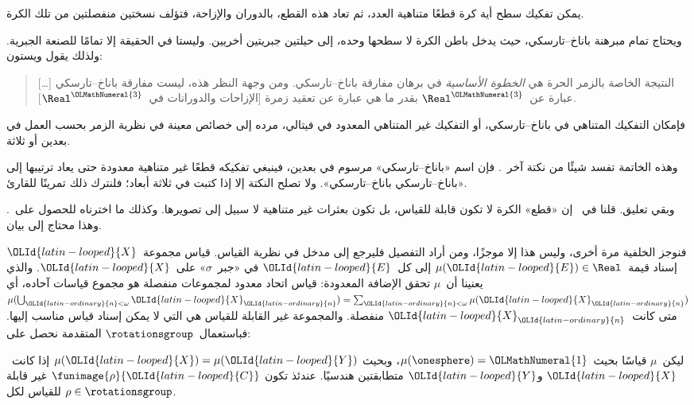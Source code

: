 \documentclass[../../../include/open-logic-section]{subfiles}
\begin{document}
\begin{thm}
يمكن تفكيك سطح أية كرة قطعًا متناهية العدد، ثم تعاد هذه القطع، بالدوران
والإزاحة، فتؤلف نسختين منفصلتين من تلك الكرة.
\end{thm}

ويحتاج تمام مبرهنة باناخ--تارسكي، حيث يدخل باطن الكرة لا سطحها وحده،
إلى حيلتين جبريتين أخريين. وليستا في الحقيقة إلا تمامًا للصنعة
الجبرية. ولذلك يقول ويستون:
\begin{quote}	
  [\ldots] النتيجة الخاصة بالزمر الحرة هي \emph{الخطوة الأساسية} في
  برهان مفارقة باناخ--تارسكي. ومن وجهة النظر هذه، ليست مفارقة
  باناخ--تارسكي عبارة عن~$\Real^\OLMathNumeral{3}$ بقدر ما هي عبارة عن تعقيد زمرة
  [الإزاحات والدورانات في~$\Real^\OLMathNumeral{3}$]. \cite[p.~16]{Weston2003}
\end{quote}
فإمكان التفكيك المتناهي في باناخ--تارسكي، أو التفكيك غير المتناهي
المعدود في فيتالي، مرده إلى خصائص معينة في نظرية الزمر بحسب العمل في
بعدين أو ثلاثة.

وهذه الخاتمة تفسد شيئًا من نكتة آخر~. فإن اسم
«باناخ--تارسكي» مرسوم في بعدين، فينبغي تفكيكه قطعًا غير متناهية معدودة
حتى يعاد ترتيبها إلى «باناخ--تارسكي باناخ--تارسكي». ولا تصلح النكتة
إلا إذا كتبت في ثلاثة أبعاد؛ فلنترك ذلك تمرينًا للقارئ.

وبقي تعليق. قلنا في~ إن «قطع» الكرة لا تكون قابلة
للقياس، بل تكون بعثرات غير متناهية لا سبيل إلى تصويرها. وكذلك ما
اخترناه للحصول على~. وهذا محتاج إلى بيان.

فنوجز الخلفية مرة أخرى، وليس هذا إلا موجزًا، ومن أراد التفصيل فليرجع
إلى مدخل في نظرية القياس. قياس مجموعة~$\OLId{latin-looped}{X}$ إسناد قيمة~$\mu(\OLId{latin-looped}{E}) \in \Real$
إلى كل~$\OLId{latin-looped}{E}$ في «جبر~$\sigma$» على~$\OLId{latin-looped}{X}$. والذي يعنينا أن~$\mu$ تحقق
الإضافة المعدودة: قياس اتحاد معدود لمجموعات منفصلة هو مجموع قياسات
آحاده، أي
$\mu(\bigcup_{\OLId{latin-ordinary}{n} < \omega} \OLId{latin-looped}{X}_\OLId{latin-ordinary}{n}) = \sum_{\OLId{latin-ordinary}{n} < \omega}\mu(\OLId{latin-looped}{X}_\OLId{latin-ordinary}{n})$ متى
كانت~$\OLId{latin-looped}{X}_\OLId{latin-ordinary}{n}$ منفصلة. والمجموعة غير القابلة للقياس هي التي لا يمكن إسناد
قياس مناسب إليها. فباستعمال~$\rotationsgroup$ المتقدمة نحصل على:

\begin{cor}[فيتالي]
ليكن~$\mu$ قياسًا بحيث~$\mu(\onesphere) = \OLMathNumeral{1}$، وبحيث
$\mu(\OLId{latin-looped}{X}) = \mu(\OLId{latin-looped}{Y})$ إذا كانت~$\OLId{latin-looped}{X}$ و$\OLId{latin-looped}{Y}$ متطابقتين هندسيًا. عندئذ تكون
$\funimage{\rho}{\OLId{latin-looped}{C}}$ غير قابلة للقياس لكل
$\rho \in \rotationsgroup$.
\end{cor}
\end{document}
